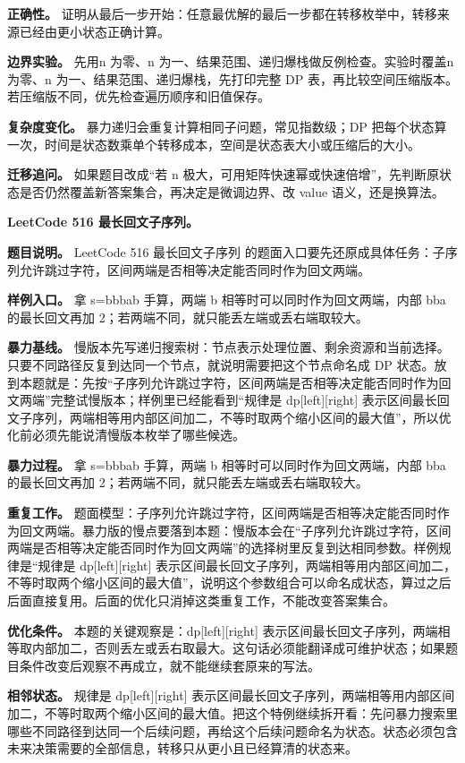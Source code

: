 \textbf{正确性。} 证明从最后一步开始：任意最优解的最后一步都在转移枚举中，转移来源已经由更小状态正确计算。

\textbf{边界实验。} 先用n 为零、n 为一、结果范围、递归爆栈做反例检查。实验时覆盖n 为零、n 为一、结果范围、递归爆栈，先打印完整 DP 表，再比较空间压缩版本。若压缩版不同，优先检查遍历顺序和旧值保存。

\textbf{复杂度变化。} 暴力递归会重复计算相同子问题，常见指数级；DP 把每个状态算一次，时间是状态数乘单个转移成本，空间是状态表大小或压缩后的大小。

\textbf{迁移追问。} 如果题目改成“若 n 极大，可用矩阵快速幂或快速倍增”，先判断原状态是否仍然覆盖新答案集合，再决定是微调边界、改 value 语义，还是换算法。

\noindent\textbf{LeetCode 516 最长回文子序列。}

\textbf{题目说明。} LeetCode 516 最长回文子序列 的题面入口要先还原成具体任务：子序列允许跳过字符，区间两端是否相等决定能否同时作为回文两端。

\textbf{样例入口。} 拿 s=bbbab 手算，两端 b 相等时可以同时作为回文两端，内部 bba 的最长回文再加 2；若两端不同，就只能丢左端或丢右端取较大。

\textbf{暴力基线。} 慢版本先写递归搜索树：节点表示处理位置、剩余资源和当前选择。只要不同路径反复到达同一个节点，就说明需要把这个节点命名成 DP 状态。放到本题就是：先按“子序列允许跳过字符，区间两端是否相等决定能否同时作为回文两端”完整试慢版本；样例里已经能看到“规律是 dp[left][right] 表示区间最长回文子序列，两端相等用内部区间加二，不等时取两个缩小区间的最大值”，所以优化前必须先能说清慢版本枚举了哪些候选。

\textbf{暴力过程。} 拿 s=bbbab 手算，两端 b 相等时可以同时作为回文两端，内部 bba 的最长回文再加 2；若两端不同，就只能丢左端或丢右端取较大。

\textbf{重复工作。} 题面模型：子序列允许跳过字符，区间两端是否相等决定能否同时作为回文两端。暴力版的慢点要落到本题：慢版本会在“子序列允许跳过字符，区间两端是否相等决定能否同时作为回文两端”的选择树里反复到达相同参数。样例规律是“规律是 dp[left][right] 表示区间最长回文子序列，两端相等用内部区间加二，不等时取两个缩小区间的最大值”，说明这个参数组合可以命名成状态，算过之后后面直接复用。后面的优化只消掉这类重复工作，不能改变答案集合。

\textbf{优化条件。} 本题的关键观察是：dp[left][right] 表示区间最长回文子序列，两端相等取内部加二，否则丢左或丢右取最大。这句话必须能翻译成可维护状态；如果题目条件改变后观察不再成立，就不能继续套原来的写法。

\textbf{相邻状态。} 规律是 dp[left][right] 表示区间最长回文子序列，两端相等用内部区间加二，不等时取两个缩小区间的最大值。把这个特例继续拆开看：先问暴力搜索里哪些不同路径到达同一个后续问题，再给这个后续问题命名为状态。状态必须包含未来决策需要的全部信息，转移只从更小且已经算清的状态来。

